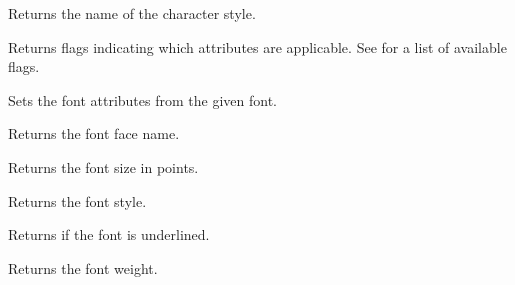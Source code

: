 \label{wxrichtextattrgetcharacterstylename}


Returns the name of the character style.

\label{wxrichtextattrgetflags}


Returns flags indicating which attributes are applicable.
See  for a list of available flags.

\label{wxrichtextattrgetfontattributes}


Sets the font attributes from the given font.

\label{wxrichtextattrgetfontfacename}


Returns the font face name.

\label{wxrichtextattrgetfontsize}


Returns the font size in points.

\label{wxrichtextattrgetfontstyle}


Returns the font style.

\label{wxrichtextattrgetfontunderlined}


Returns \true if the font is underlined.

\label{wxrichtextattrgetfontweight}


Returns the font weight.

\label{wxrichtextattrgetleftindent}


